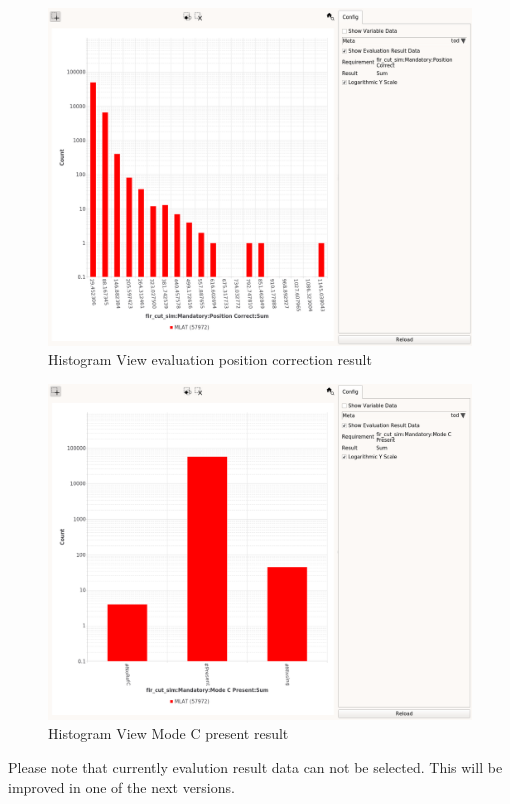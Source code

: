 \begin{figure}[H]
    \hspace*{-2cm}
    \includegraphics[width=18cm,frame]{../screenshots/histogram_eval_pos_correct.png}
  \caption{Histogram View evaluation position correction result}
\end{figure}


\begin{figure}[H]
    \hspace*{-2cm}
    \includegraphics[width=18cm,frame]{../screenshots/histogram_eval_mc.png}
  \caption{Histogram View Mode C present result}
\end{figure}

Please note that currently evalution result data can not be selected. This will be improved in one of the next versions.

